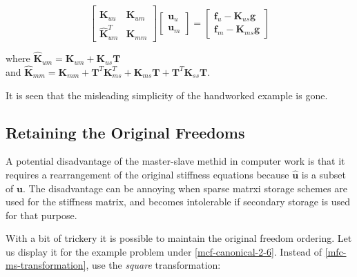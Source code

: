 \documentclass[10pt,b5paper,titlepage]{book}
\newcommand{\m}{\mathbf}
\begin{document}
\begin{equation}
    \begin{bmatrix}
        \m{K}_{uu} & \m{\hat{K}}_{um} \\
        \m{\hat{K}}_{um}^T &
        \m{\hat{K}}_{mm}
    \end{bmatrix}
    \begin{bmatrix}
        \m{u}_u \\
        \m{u}_m
    \end{bmatrix}
    = \begin{bmatrix}
        \m{f}_u - \m{K}_{us} \m{g} \\
        \m{f}_m - \m{K}_{ms} \m{g}
    \end{bmatrix}
\end{equation}

where $ \m{\hat{K}}_{um} = \m{K}_{um} + \m{K}_{us} \m{T} $ \\
and $ \m{\hat{K}}_{mm} = \m{K}_{mm} + \m{T}^T \m{K}_{ms}^T
+ \m{K}_{ms} \m{T} + \m{T}^T \m{K}_{ss} \m{T} $.

It is seen that the misleading simplicity of the handworked example is gone.


\subsection{Retaining the Original Freedoms}

A potential disadvantage of the master-slave methid in computer work is that it
requires a rearrangement of the original stiffness equations because
$ \m{\hat{u}} $ is a subset of $ \m{u} $. The disadvantage can be
annoying when sparse matrxi storage schemes are used for the stiffness matrix,
and becomes intolerable if secondary storage is used for that purpose.

With a bit of trickery it is possible to maintain the original freedom ordering.
Let us display it for the example problem under \eqref{mcf-canonical-2-6}.
Instead of \eqref{mfc-ms-transformation}, use the \textit{square} transformation:
\end{document}
